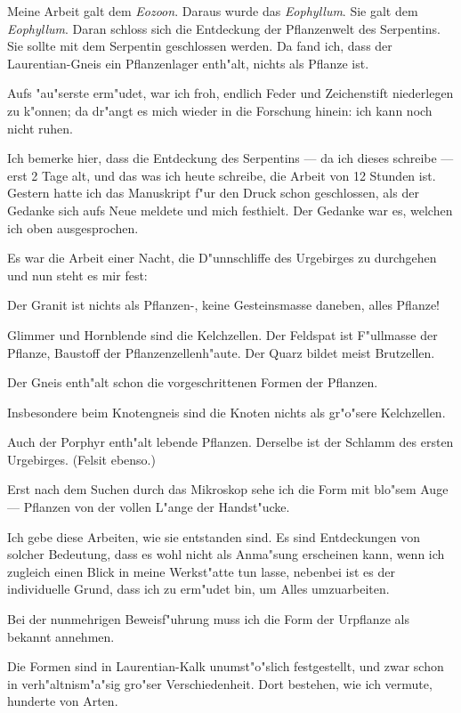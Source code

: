 \documentclass[a4paper, 11pt, oneside, german]{article}
\begin{document}
Meine Arbeit galt dem \emph{Eozoon}. Daraus wurde das \emph{Eophyllum}. Sie galt dem \emph{Eophyllum}. Daran schloss sich die Entdeckung der Pflanzenwelt des Serpentins. Sie sollte mit dem Serpentin geschlossen werden. Da fand ich, dass der Laurentian-Gneis ein Pflanzenlager enth"alt, nichts als Pflanze ist.

Aufs "au"serste erm"udet, war ich froh, endlich Feder und Zeichenstift niederlegen zu k"onnen; da dr"angt es mich wieder in die Forschung hinein: ich kann noch nicht ruhen.

Ich bemerke hier, dass die Entdeckung des Serpentins --- da ich dieses schreibe --- erst 2 Tage alt, und das was ich heute schreibe, die Arbeit von 12 Stunden ist. Gestern hatte ich das Manuskript f"ur den Druck schon geschlossen, als der Gedanke sich aufs Neue meldete und mich festhielt. Der Gedanke war es, welchen ich oben ausgesprochen.

Es war die Arbeit einer Nacht, die D"unnschliffe des Urgebirges zu durchgehen und nun steht es mir fest:

Der Granit ist nichts als Pflanzen-, keine Gesteinsmasse daneben, alles Pflanze!

Glimmer und Hornblende sind die Kelchzellen. Der Feldspat ist F"ullmasse der Pflanze, Baustoff der Pflanzenzellenh"aute. Der Quarz bildet meist Brutzellen.

Der Gneis enth"alt schon die vorgeschrittenen Formen der Pflanzen.

Insbesondere beim Knotengneis sind die Knoten nichts als gr"o"sere Kelchzellen.

Auch der Porphyr enth"alt lebende Pflanzen. Derselbe ist der Schlamm des ersten Urgebirges. (Felsit ebenso.)

Erst nach dem Suchen durch das Mikroskop sehe ich die Form mit blo"sem Auge --- Pflanzen von der vollen L"ange der Handst"ucke.

Ich gebe diese Arbeiten, wie sie entstanden sind. Es sind Entdeckungen von solcher Bedeutung, dass es wohl nicht als Anma"sung erscheinen kann, wenn ich zugleich einen Blick in meine Werkst"atte tun lasse, nebenbei ist es der individuelle Grund, dass ich zu erm"udet bin, um Alles umzuarbeiten.

Bei der nunmehrigen Beweisf"uhrung muss ich die Form der Urpflanze als bekannt annehmen.

Die Formen sind in Laurentian-Kalk unumst"o"slich festgestellt, und zwar schon in verh"altnism"a"sig gro"ser Verschiedenheit. Dort bestehen, wie ich vermute, hunderte von Arten.
\end{document}
